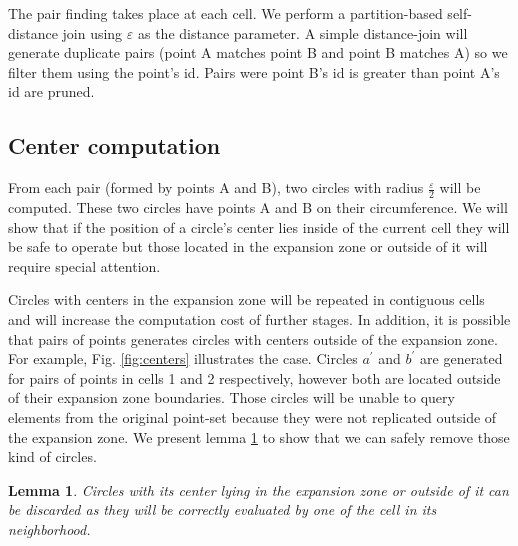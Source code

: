 \documentclass[twocolumn]{IEEEtran}
\newtheorem{lemma}{Lemma}
\begin{document}
The pair finding takes place at each cell.  We perform a partition-based self-distance join using  $\varepsilon$ as the distance parameter.  A simple distance-join will generate duplicate pairs (point A matches point B and point B matches A) so we filter them using the point's id. Pairs were point B's id is greater than point A's id are pruned. 

\subsection*{Center computation}
From each pair (formed by points A and B), two circles with radius $\frac{\varepsilon}{2}$ will be computed.  These two circles have points A and B on their circumference. We will show that if the position of a circle's center lies inside of the current cell they will be safe to operate but those located in the expansion zone or outside of it will require special attention.  

Circles with centers in the expansion zone will be repeated in contiguous cells and will increase the computation cost of further stages.  In addition, it is possible that pairs of points generates circles with centers outside of the expansion zone.  For example, Fig. \ref{fig:centers} illustrates the case.  Circles $a^\prime$ and $b^\prime$ are generated for pairs of points in cells 1 and 2 respectively, however both are located outside of their expansion zone boundaries.  Those circles will be unable to query elements from the original point-set because they were not replicated outside of the expansion zone.  We present lemma \ref{lemma:circles} to show that we can safely remove those kind of circles.

\begin{lemma}\label{lemma:circles}
Circles with its center lying in the expansion zone or outside of it can be discarded as they will be correctly evaluated by one of the cell in its neighborhood. 
\end{lemma}
\end{document}
